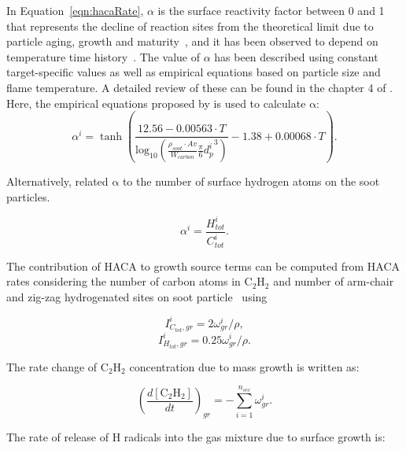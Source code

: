 In Equation~\eqref{eqn:hacaRate}, $\alpha$ is the surface reactivity factor between 0 and 1 that represents the decline of reaction sites from the theoretical limit due to particle aging, growth and maturity~\citep{haynes1982surface, harris1985chemical}, and it has been observed to depend on temperature time history~\cite{homann1985formation, dasch1985decay}. The value of $\alpha$ has been described using constant target-specific values as well as empirical equations based on particle size and flame temperature. A detailed review of these can be found in the chapter 4 of \citep{veshkini2015understanding}.  Here, the empirical equations proposed by \citet{appel2000kinetic} is used to calculate $\mathrm{\alpha}$:
\begin{equation}
	\alpha^i = \tanh 
	\left(
	\frac{12.56 - 0.00563\cdot T}
	{\mbox{log}_{10}
		\left( \frac{\rho_{soot}\cdot Av}{W_{carbon}} \frac{\pi}{6}{d^i_p}^3 \right) } -1.38+0.00068\cdot T
	\right)
	\label{eqn:alpha}.
\end{equation}

Alternatively, \citet{blanquart2009joint} related $\mathrm{\alpha}$ to the number of surface hydrogen atoms on the soot particles.

\begin{equation}
	\alpha^i = \frac{H^i_{tot}}{C^i_{tot}}
	\label{eqn:alpha_htoc}.
\end{equation}

The contribution of HACA to growth source terms can be computed from HACA rates considering the number of carbon atoms in $\mathrm{C_2H_2}$ and number of arm-chair and zig-zag hydrogenated sites on soot particle~\cite{blanquart2009analyzing} using

\begin{equation}
	I^i_{C_{tot},gr} = 2\omega^i_{gr}/\rho
	\label{eqn:IiCtotgr},
\end{equation}
\begin{equation}
	I^i_{H_{tot},gr} = 0.25\omega^i_{gr}/\rho
	\label{eqn:IiHtotgr}.
\end{equation}

The rate change of $\mathrm{C_2H_2}$ concentration due to mass growth is written as:

\begin{equation}
	\left(\frac{d\left[{\mathrm{C_2H_2}}\right]}{dt}\right)_{gr} = -\sum_{i=1}^{n_{sec}}\omega^i_{gr}
	\label{eqn:C2H2rate_gr}.
\end{equation}

The rate of release of H radicals into the gas mixture due to surface growth is:

